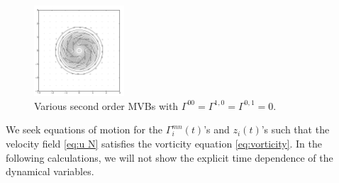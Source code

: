 \documentclass[12pt]{amsart}
\theoremstyle{remark}
\begin{document}
\begin{figure}[p]
	\includegraphics[clip,trim =1in 1in 1in 1in,width=0.3\textwidth]{./images/two_xx_yy.pdf} 
	\caption{Various second order MVBs with $\Gamma^{00} = \Gamma^{1,0} = \Gamma^{0,1} = 0$.}
	\label{fig:second}
\end{figure}

We seek equations of motion for the $\Gamma^{mn}_i(t)$'s and $z_i(t)$'s
such that the velocity field \eqref{eq:u N} satisfies the vorticity equation \eqref{eq:vorticity}.
In the following calculations, we will not show the explicit time dependence of the dynamical variables.
\end{document}

